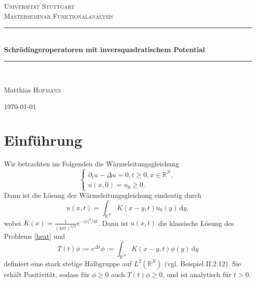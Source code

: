 \documentclass[11pt]{article}
\theoremstyle{break}
\begin{document}
\begin{titlepage}

\begin{center}



\textsc{\LARGE Universit\"at Stuttgart}\\[1.5cm]

\textsc{\Large Masterseminar Funktionalanalysis}\\[0.5cm]


\newcommand{\HRule}{\rule{\linewidth}{0.5mm}}
\HRule \\[0.4cm]
{ \huge \bfseries Schr\"odingeroperatoren mit inversquadratischem Potential}\\[0.4cm]

\HRule \\[1.5cm]


\begin{center} \Large
Matthias \textsc{Hofmann}
\end{center}

\hfill

\vfill

{\large \today}

\end{center}

\end{titlepage}
\section{Einf\"uhrung}
Wir betrachten im Folgenden die W\"armeleitungsgleichung
\begin{equation}\label{heat}
\begin{cases}
\partial_t u - \Delta u =0, t\ge 0, x\in \mathbb R^N,\\
u(x,0)=u_0 \ge 0.
\end{cases}
\end{equation}
Dann ist die L\"osung der W\"armeleitungsgleichung eindeutig durch
\begin{equation}
u(x,t)=\int_{\mathbb R^N} K(x-y, t) u_0(y) \, \mathrm dy,
\end{equation}
wobei $K(x)=\frac{1}{(4\pi t)^{n/2}} e^{-|x|^2/4t}$. Dann ist $u(x,t)$ die klassische L\"osung des Problems \eqref{heat} 
und
\begin{equation}
T(t)\phi:=e^{\Delta t}\phi:=\int_{\mathbb R^N} K(x-y,t) \phi(y)\, \mathrm dy 
\end{equation}
definiert eine stark stetige Halbgruppe auf $L^2(\mathbb R^N)$ (vgl. \cite{engel-nagel} Beispiel II.2.12). Sie erh\"alt Positivit\"at, sodass f\"ur $\phi \ge 0$ auch $T(t) \phi \ge 0$, und ist analytisch f\"ur $t>0$.
\end{document}
